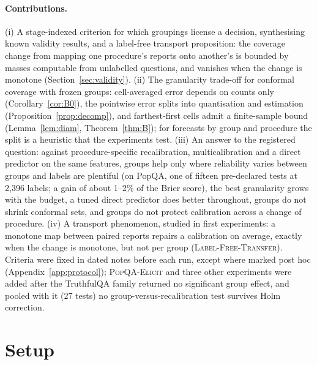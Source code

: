\documentclass[11pt]{article}
\theoremstyle{definition}
\theoremstyle{remark}
\newcommand{\1}{\mathbf{1}}
\newcommand{\expname}[1]{\textsc{#1}}
\begin{document}
\paragraph{Contributions.}
(i) A stage-indexed criterion for which groupings license a decision, synthesising known validity
results, and a label-free transport proposition: the coverage change from mapping one procedure's reports
onto another's is bounded by masses computable from unlabelled questions, and vanishes when the change is
monotone (Section~\ref{sec:validity}).
(ii) The granularity trade-off for conformal coverage with frozen groups: cell-averaged error depends on
counts only (Corollary~\ref{cor:B0}), the pointwise error splits into quantisation and estimation
(Proposition~\ref{prop:decomp}), and farthest-first cells admit a finite-sample bound (Lemma~\ref{lem:diam},
Theorem~\ref{thm:B}); for forecasts by group and procedure the split is a heuristic that the experiments test.
(iii) An answer to the registered question: against procedure-specific recalibration, multicalibration
and a direct predictor on the same features, groups help only where reliability varies between groups and
labels are plentiful (on PopQA, one of fifteen pre-declared tests at 2{,}396 labels; a gain of about 1--2\%
of the Brier score), the best granularity grows with the budget, a tuned direct predictor does better
throughout, groups do not shrink conformal sets, and groups do not protect calibration across a change of
procedure.
(iv) A transport phenomenon, studied in first experiments: a monotone map between paired reports repairs a
calibration on average, exactly when the change is monotone, but not per group (\expname{Label-Free-Transfer}).
Criteria were fixed in dated notes before each run, except where marked post hoc (Appendix~\ref{app:protocol});
\expname{PopQA-Elicit} and three other experiments were added after the TruthfulQA family returned no significant
group effect, and pooled with it (27 tests) no group-versus-recalibration test survives Holm correction. 



\section{Setup}
\label{sec:setup}

\end{document}
